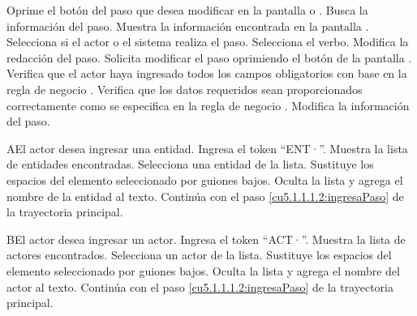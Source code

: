  \begin{UCtrayectoria}
	 \UCpaso[\UCactor] Oprime el botón \btnEditar del paso que desea modificar en la pantalla  o . 
	\UCpaso[\UCsist] Busca la información del paso.
	\UCpaso[\UCsist] Muestra la información encontrada en la pantalla . 
	\UCpaso[\UCactor] Selecciona si el actor o el sistema realiza el paso.\label{cu5.1.1.1.2:ingresaDatos}
	\UCpaso[\UCactor] Selecciona el verbo.
	\UCpaso[\UCactor] Modifica la redacción del paso.           \label{cu5.1.1.1.2:ingresaPaso}
	\UCpaso[\UCactor] Solicita modificar el paso oprimiendo el botón  de la pantalla .  
	\UCpaso[\UCsist] Verifica que el actor haya ingresado todos los campos obligatorios con base en la regla de negocio . 
	\UCpaso[\UCsist] Verifica que los datos requeridos sean proporcionados correctamente como se especifica en la regla de negocio .  
	\UCpaso[\UCsist] Modifica la información del paso.
\end{UCtrayectoria}

    

 \begin{UCtrayectoriaA}{A}{El actor desea ingresar una entidad.}
 	 \UCpaso[\UCactor] Ingresa el token ``ENT·''.
 	\UCpaso[\UCsist] Muestra la lista de entidades encontradas.
 	\UCpaso[\UCactor] Selecciona una entidad de la lista.
  	\UCpaso[\UCsist] Sustituye los espacios del elemento seleccionado por guiones bajos.
  	\UCpaso[\UCsist] Oculta la lista y agrega el nombre de la entidad al texto.
    \UCpaso[] Continúa con el paso \ref{cu5.1.1.1.2:ingresaPaso} de la trayectoria principal.
 \end{UCtrayectoriaA}
 
 \begin{UCtrayectoriaA}{B}{El actor desea ingresar un actor.}
 	\UCpaso[\UCactor] Ingresa el token ``ACT·''.
 	\UCpaso[\UCsist] Muestra la lista de actores encontrados.
 	\UCpaso[\UCactor] Selecciona un actor de la lista.
  	\UCpaso[\UCsist] Sustituye los espacios del elemento seleccionado por guiones bajos.
  	\UCpaso[\UCsist] Oculta la lista y agrega el nombre del actor al texto.
    \UCpaso[] Continúa con el paso \ref{cu5.1.1.1.2:ingresaPaso} de la trayectoria principal.
 \end{UCtrayectoriaA}

